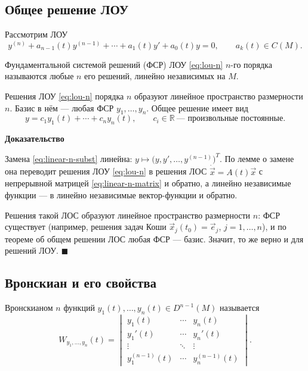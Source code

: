 \documentclass[12pt,a4paper]{article}
\numberwithin{equation}{section}
\newcommand{\R}{\mathbb{R}}
\newcommand{\vect}[1]{\vec{#1}}
\renewenvironment{proof}[1][Доказательство]{\begin{center}\textbf{#1}\end{center}}{\hfill$\blacksquare$\par}
\begin{document}
\subsection{Общее решение ЛОУ}

Рассмотрим ЛОУ
\begin{equation}
y^{(n)}+a_{n-1}(t)y^{(n-1)}+\cdots+a_1(t)y'+a_0(t)y=0,\qquad a_k(t)\in C(M).
\label{eq:lou-n}
\end{equation}

\begin{definitionHSE}
Фундаментальной системой решений (ФСР) ЛОУ \eqref{eq:lou-n} \(n\)-го порядка называются любые \(n\) его решений, линейно независимых на \(M\).
\end{definitionHSE}

\begin{theoremHSE}
Решения ЛОУ \eqref{eq:lou-n} порядка \(n\) образуют линейное пространство размерности \(n\). Базис в нём --- любая ФСР \(y_1,\ldots,y_n\). Общее решение имеет вид
\[
y=c_1y_1(t)+\cdots+c_ny_n(t),\qquad c_i\in\R\ \text{--- произвольные постоянные}.
\]
\end{theoremHSE}

\begin{proof}
Замена \eqref{eq:linear-n-subst} линейна: \(y\mapsto\bigl(y,y',\ldots,y^{(n-1)}\bigr)^{T}\). По лемме о замене она переводит решения ЛОУ \eqref{eq:lou-n} в решения ЛОС \(\dot{\vect{x}}=A(t)\vect{x}\) с непрерывной матрицей \eqref{eq:linear-n-matrix} и обратно, а линейно независимые функции --- в линейно независимые вектор-функции и обратно.

Решения такой ЛОС образуют линейное пространство размерности \(n\): ФСР существует (например, решения задач Коши \(\vect{x}_j(t_0)=\vect{e}_j\), \(j=1,\ldots,n\)), и по теореме об общем решении ЛОС любая ФСР --- базис. Значит, то же верно и для решений ЛОУ.
\end{proof}

\subsection{Вронскиан и его свойства}

\begin{definitionHSE}
Вронскианом \(n\) функций \(y_1(t),\ldots,y_n(t)\in D^{n-1}(M)\) называется
\begin{equation}
W_{y_1,\ldots,y_n}(t)=
\begin{vmatrix}
y_1(t)&\cdots&y_n(t)\\
y_1'(t)&\cdots&y_n'(t)\\
\vdots&\ddots&\vdots\\
y_1^{(n-1)}(t)&\cdots&y_n^{(n-1)}(t)
\end{vmatrix}.
\label{eq:wronskian-n}
\end{equation}
\end{definitionHSE}
\end{document}
